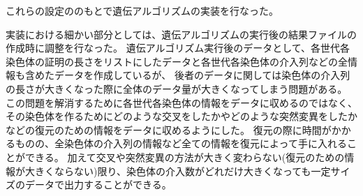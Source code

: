 これらの設定ののもとで遺伝アルゴリズムの実装を行なった。


実装における細かい部分としては、遺伝アルゴリズムの実行後の結果ファイルの作成時に調整を行なった。
遺伝アルゴリズム実行後のデータとして、各世代各染色体の証明の長さをリストにしたデータと各世代各染色体の介入列などの全情報も含めたデータを作成しているが、
後者のデータに関しては染色体の介入列の長さが大きくなった際に全体のデータ量が大きくなってしまう問題がある。
この問題を解消するために各世代各染色体の情報をデータに収めるのではなく、その染色体を作るためにどのような交叉をしたかやどのような突然変異をしたかなどの復元のための情報をデータに収めるようにした。
復元の際に時間がかかるものの、全染色体の介入列の情報など全ての情報を復元によって手に入れることができる。
加えて交叉や突然変異の方法が大きく変わらない(復元のための情報が大きくならない)限り、染色体の介入数がどれだけ大きくなっても一定サイズのデータで出力することができる。